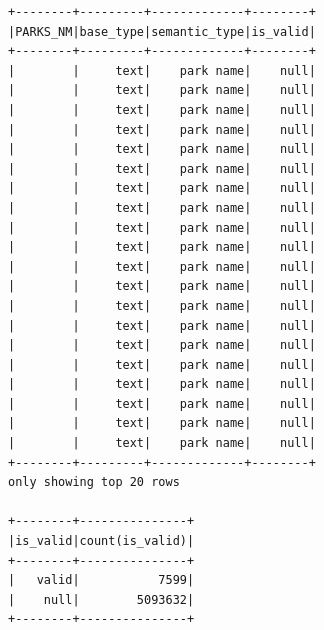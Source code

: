 \documentclass{article}
\begin{document}
\begin{itemize}
\begin{verbatim}
+--------+---------+-------------+--------+
|PARKS_NM|base_type|semantic_type|is_valid|
+--------+---------+-------------+--------+
|        |     text|    park name|    null|
|        |     text|    park name|    null|
|        |     text|    park name|    null|
|        |     text|    park name|    null|
|        |     text|    park name|    null|
|        |     text|    park name|    null|
|        |     text|    park name|    null|
|        |     text|    park name|    null|
|        |     text|    park name|    null|
|        |     text|    park name|    null|
|        |     text|    park name|    null|
|        |     text|    park name|    null|
|        |     text|    park name|    null|
|        |     text|    park name|    null|
|        |     text|    park name|    null|
|        |     text|    park name|    null|
|        |     text|    park name|    null|
|        |     text|    park name|    null|
|        |     text|    park name|    null|
|        |     text|    park name|    null|
+--------+---------+-------------+--------+
only showing top 20 rows

+--------+---------------+
|is_valid|count(is_valid)|
+--------+---------------+
|   valid|           7599|
|    null|        5093632|
+--------+---------------+
\end{verbatim}


\end{itemize}
\end{document}
